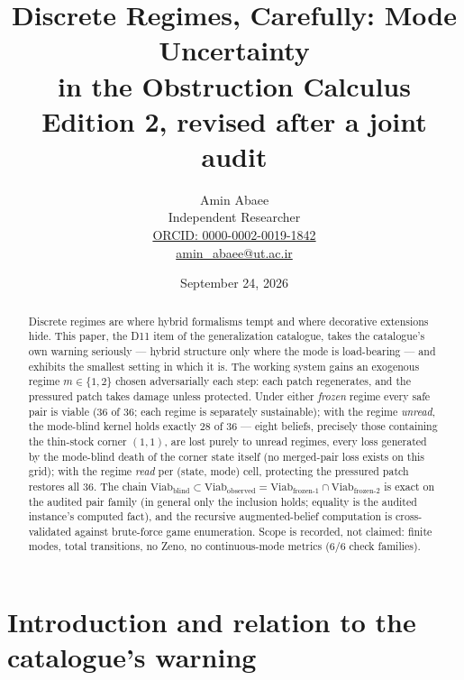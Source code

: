 \documentclass[10pt,twocolumn]{article}
\theoremstyle{definition}
\begin{document}
\title{Discrete Regimes, Carefully: Mode Uncertainty\\ in the Obstruction Calculus\\[0.2em]
{\large\rmfamily Edition 2, revised after a joint audit}}
\author{Amin Abaee\\[0.35em]
{\small Independent Researcher}\\[0.55em]
{\small\href{https://orcid.org/0000-0002-0019-1842}{ORCID: 0000-0002-0019-1842}}\\[0.3em]
{\small\href{mailto:amin\_abaee@ut.ac.ir}{amin\_abaee@ut.ac.ir}}}
\date{September 24, 2026}
\maketitle

\begin{abstract}
Discrete regimes are where hybrid formalisms tempt and where decorative
extensions hide. This paper, the D11 item of the generalization catalogue,
takes the catalogue's own warning seriously --- hybrid structure only where
the mode is load-bearing --- and exhibits the smallest setting in which it
is. The working system gains an exogenous regime $m\in\{1,2\}$ chosen
adversarially each step: each patch regenerates, and the pressured patch
takes damage unless protected. Under either \emph{frozen} regime every
safe pair is viable ($36$ of $36$; each regime is separately
sustainable); with the regime \emph{unread}, the mode-blind kernel holds
exactly $28$ of $36$ --- eight beliefs, precisely those containing the
thin-stock corner $(1,1)$, are lost purely to unread regimes, every loss
generated by the mode-blind death of the corner state itself (no
merged-pair loss exists on this grid); with the regime \emph{read} per
(state, mode) cell, protecting the pressured patch restores all $36$. The
chain
$\mathrm{Viab}_{\text{blind}}\subset\mathrm{Viab}_{\text{observed}}=
\mathrm{Viab}_{\text{frozen-}1}\cap\mathrm{Viab}_{\text{frozen-}2}$ is
exact on the audited pair family (in general only the inclusion holds;
equality is the audited instance's computed fact), and the recursive
augmented-belief computation is cross-validated against brute-force game
enumeration. Scope is recorded, not claimed:
finite modes, total transitions, no Zeno, no continuous-mode metrics
(6/6 check families).
\end{abstract}

\section{Introduction and relation to the catalogue's warning}
\end{document}
